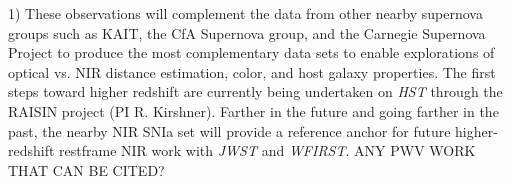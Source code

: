 \documentclass[11pt]{article}
\begin{document}
% 



% 
% 
%

\otherfacilities

1) These observations will complement the data from other nearby supernova groups such as KAIT, the CfA Supernova group, and the Carnegie Supernova Project to produce the most complementary data sets to enable explorations of optical vs. NIR distance estimation, color, and host galaxy properties.
The first steps toward higher redshift are currently being undertaken on {\it HST} through the RAISIN project (PI R. Kirshner).
Farther in the future and going farther in the past, the nearby NIR SNIa set will provide a reference anchor for future higher-redshift restframe NIR work with {\it JWST} and {\it WFIRST}. ANY PWV WORK THAT CAN BE CITED?
\end{document}

